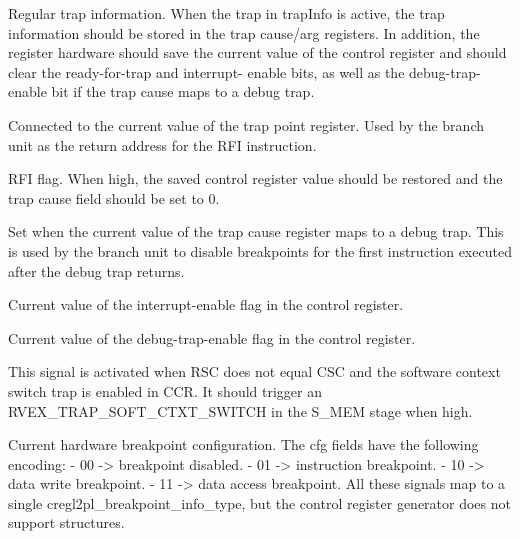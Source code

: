 \ifaceSubGroup{}
Regular trap information. When the trap in trapInfo is active, the trap 
information should be stored in the trap cause/arg registers. In addition, the 
register hardware should save the current value of the control register and 
should clear the ready-for-trap and interrupt- enable bits, as well as the 
debug-trap-enable bit if the trap cause maps to a debug trap.

\ifaceSubGroup{}
Connected to the current value of the trap point register. Used by the branch 
unit as the return address for the RFI instruction.

\ifaceSubGroup{}
RFI flag. When high, the saved control register value should be restored and the 
trap cause field should be set to 0.

\ifaceSubGroup{}
Set when the current value of the trap cause register maps to a debug trap. This 
is used by the branch unit to disable breakpoints for the first instruction 
executed after the debug trap returns.

\ifaceSubGroup{}
Current value of the interrupt-enable flag in the control register.

\ifaceSubGroup{}
Current value of the debug-trap-enable flag in the control register.

\ifaceSubGroup{}
This signal is activated when RSC does not equal CSC and the software context
switch trap is enabled in CCR. It should trigger an RVEX_TRAP_SOFT_CTXT_SWITCH
in the S_MEM stage when high.

\ifaceSubGroup{}
Current hardware breakpoint configuration. The cfg fields have the following
encoding:
 - 00 -> breakpoint disabled.
 - 01 -> instruction breakpoint.
 - 10 -> data write breakpoint.
 - 11 -> data access breakpoint.
All these signals map to a single cregl2pl_breakpoint_info_type, but the
control register generator does not support structures.


